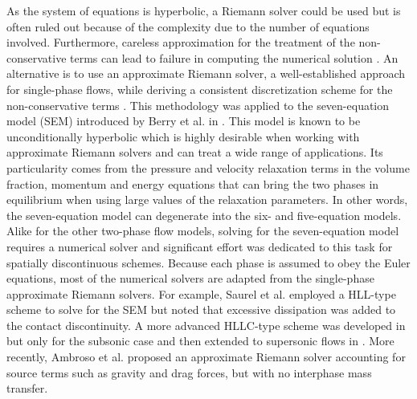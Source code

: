 \documentclass[preprint,10pt]{elsarticle}
\begin{document}
As the system of equations is hyperbolic, a Riemann solver could be used but is often ruled out because of the complexity due to the number of equations involved. Furthermore, careless approximation for the treatment of the non-conservative terms can lead to failure in computing the numerical solution \cite{Abgrall_2002}. An alternative is to use an approximate Riemann solver, a well-established approach for single-phase flows, while deriving a consistent discretization scheme for the non-conservative terms \cite{Li_2004,Abgrall_2002}. 
This methodology was applied to the seven-equation model (SEM) introduced by Berry et al. in \cite{SEM}. This model is known to be unconditionally hyperbolic which is highly desirable when working with approximate Riemann solvers and can treat a wide range of applications. Its particularity comes from the pressure and velocity relaxation terms in the volume fraction, momentum and energy equations that can bring the two phases in equilibrium when using large values of the relaxation parameters. In other words, the seven-equation model can degenerate into the six- and five-equation models. 
%
Alike for the other two-phase flow models, solving for the seven-equation model requires a numerical solver and significant effort was dedicated to this task for spatially discontinuous schemes. Because each phase is assumed to obey the Euler equations, most of the numerical solvers are adapted from the single-phase approximate Riemann solvers. For example, Saurel et al. \cite{Saurel_2001a, Saurel_2001b} employed a HLL-type scheme to solve for the SEM but noted that excessive dissipation was added to the contact discontinuity. A more advanced HLLC-type scheme was developed in \cite{Li_2004} but only for the subsonic case and then extended to supersonic flows in \cite{Zein_2010}. More recently, Ambroso et al. \cite{Ambroso_2012} proposed an approximate Riemann solver accounting for source terms such as gravity and drag forces, but with no interphase mass transfer.
\end{document}
